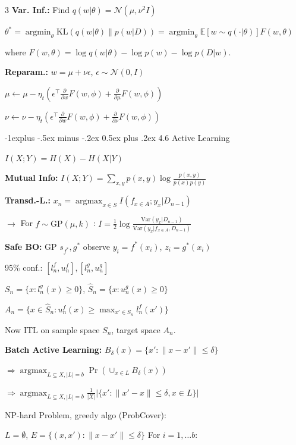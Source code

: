 \documentclass[10pt,landscape,a4paper]{article}
\makeatletter
\renewcommand{\subsection}{\@startsection{subsection}{2}{0mm}%
                                {-1explus -.5ex minus -.2ex}%
                                {0.5ex plus .2ex}%
                                {\normalfont\normalsize\bfseries}}
\newcommand{\E}{\mathbb{E}}
\DeclareMathOperator*{\argmax}{argmax}
\DeclareMathOperator*{\argmin}{argmin}
\makeatother
\begin{document}
\begin{multicols}{3}
\textbf{Var. Inf.:} Find $q(w|\theta) = \mathcal{N}(\mu, \nu^2 I)$

$\theta^* = \argmin_\theta \text{KL}(q(w|\theta) \| p(w|D)) = \argmin_\theta \E[w \sim q(\cdot|\theta)]{F(w,\theta)}$

where $F(w,\theta) = \log q(w|\theta) - \log p(w) - \log p(D|w)$.

\textbf{Reparam.:} $w = \mu + \nu \epsilon$, $\epsilon \sim \mathcal{N}(0,I)$

$\mu \leftarrow \mu - \eta_t(\epsilon^\top\frac{\partial}{\partial w}F(w,\phi) + \frac{\partial}{\partial \mu}F(w,\phi))$

$\nu \leftarrow \nu - \eta_t(\epsilon^\top\frac{\partial}{\partial w}F(w,\phi) + \frac{\partial}{\partial \nu}F(w,\phi))$

\subsection{4.6 Active Learning}

$I(X;Y) = H(X) - H(X|Y)$

\textbf{Mutual Info:} $I(X;Y) = \sum_{x,y} p(x,y) \log \frac{p(x,y)}{p(x)p(y)}$

\textbf{Transd.-L.:} $x_n = \argmax_{x \in S} I(f_{x \in A}; y_x | D_{n-1})$

$\to$ For $f \sim \text{GP}(\mu,k)$ : $I = \frac{1}{2}\log \frac{\text{Var}(y_x|D_{n-1})}{\text{Var}(y_x|f_{x \in A}, D_{n-1})}$

\textbf{Safe BO:} GP $s_{f^*}, g^*$ observe $y_i = f^*(x_i)$, $z_i = g^*(x_i)$

95\% conf.: $[l_n^f, u_n^f], [l_n^g, u_n^g]$

$S_n = \{x : l_n^g(x) \geq 0\}$, $\hat{S}_n = \{x : u_n^g(x) \geq 0\}$

$A_n = \{x \in \hat{S}_n : u_n^f(x) \geq \max_{x' \in S_n} l_n^f(x')\}$

Now ITL on sample space $S_n$, target space $A_n$.

\textbf{Batch Active Learning:} $B_\delta(x) = \{x' : \|x - x'\| \leq \delta\}$

$\Rightarrow \argmax_{L \subseteq X, |L|=b} \Pr(\cup_{x \in L} B_\delta(x))$

$\Rightarrow \argmax_{L \subseteq X, |L|=b} \frac{1}{|X|}|\{x' : \|x' - x\| \leq \delta, x \in L\}|$

NP-hard Problem, greedy algo (ProbCover):

$L = \emptyset$, $E = \{(x, x') : \|x - x'\| \leq \delta\}$ For $i = 1, \ldots b$:


\end{multicols}
\end{document}
